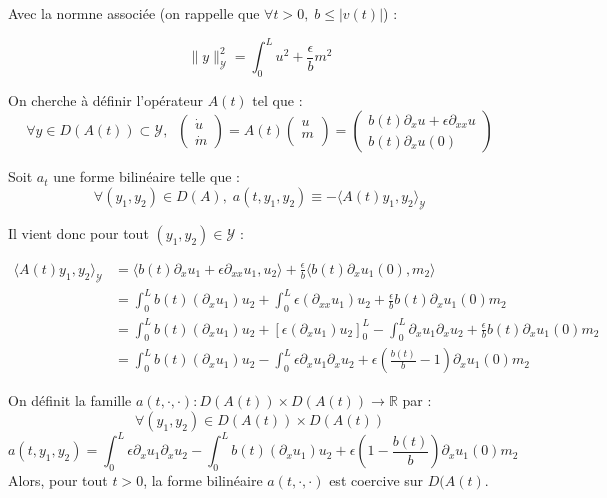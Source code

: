 \documentclass[a4paper]{article}
\newcommand{\dep}{b}
\begin{document}
  Avec la normne associée 
  (on rappelle que $\forall t>0, \;  \dep \leq |v(t)|$) :
  
  \[\| y\|_{\mathscr{Y}}^2 = \int_0^L u^2 + \displaystyle \frac{\epsilon}{\dep} m^2 \]


 On cherche à définir l'opérateur $A(t)$ tel que :
 \[ \forall y \in D(A(t)) \subset \mathscr{Y}, \; \; 
 \left( \begin{array}{c}
 \dot{u}\\
 \dot{m}
 \end{array} \right)
 = A(t) \left( \begin{array}{c}
 u\\
 m\\
 \end{array} \right) 
 = \left(\begin{array}{c}
 \dep(t) \partial_x u + \epsilon \partial_{xx} u\\
 \dep(t) \partial_x u(0)
 \end{array}\right) \]
 
 Soit $a_t$ une forme bilinéaire telle que :
 \[ \forall (y_1,y_2) \in D(A), \; 
 a(t,y_1,y_2) \equiv - \langle A(t) y_1,y_2\rangle_{\mathscr{Y}} \]

 Il vient donc pour tout $(y_1,y_2) \in \mathscr{Y}$ :

 \[
 \begin{split}
 	\langle A(t) y_1,y_2\rangle_{\mathscr{Y}} 
	                   & =  \langle \dep (t) \partial_x u_1 + \epsilon \partial_{xx}u_1 ,u_2\rangle
 					  + \displaystyle \frac{\epsilon}{\dep} \langle \dep (t) \partial_x u_1(0),m_2 \rangle \\	
                         &= \int_0^L \dep (t) (\partial_x u_1)u_2
                            + \int_0^L \epsilon (\partial_{xx} u_1)u_2
                            + \displaystyle \frac{\epsilon}{\dep} \dep (t) \partial_xu_1(0)m_2\\
 						& =   \int_0^L \dep(t) (\partial_xu_1)u_2
 						   + [\epsilon (\partial_x u_1)u_2]_0^L 
 						  - \int_0^L \partial_xu_1 \partial_xu_2
 						   + \displaystyle \frac{\epsilon}{\dep} \dep (t) \partial_xu_1(0)m_2\\
 						& = \int_0^L \dep (t) (\partial_xu_1)u_2
 						 - \int_0^L \epsilon \partial_xu_1 \partial_xu_2
 					+ \epsilon (\displaystyle \frac{\dep (t)}{\dep} - 1) \partial_xu_1(0)m_2
\end{split}
\]

\begin{lemme}
 	On définit la famille 
	$a(t,\cdot, \cdot): D(A(t)) \times D(A(t)) \to \mathbb{R}$ par :
 	\[
 	\forall (y_1,y_2) \in D(A(t)) \times D(A(t))
	\]
	\begin{equation}
		\label{def:a3}
		 a(t,y_1,y_2) = \int_0^L \epsilon \partial_xu_1 \partial_xu_2
		                 - \int_0^L \dep (t) (\partial_xu_1)u_2
						 + \epsilon (1 - \displaystyle \frac{\dep (t)}{\dep}) \partial_xu_1(0)m_2
	\end{equation}
	Alors, pour tout $t>0$, la forme bilinéaire $a(t, \cdot, \cdot)$ est coercive sur $D(A(t)$.
\end{lemme}
\end{document}
